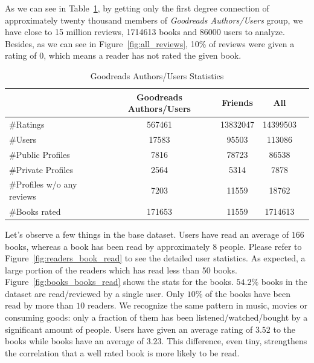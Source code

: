 \documentclass[11pt]{article}
\begin{document}
As we can see in Table~\ref{table:crawl_stat}, by getting only the first degree connection of approximately twenty thousand members of {\it Goodreads Authors/Users} group, we have close to 15 million reviews, 1714613 books and 86000 users to analyze. Besides, as we can see in Figure~\ref{fig:all_reviews}, 10\% of reviews were given a rating of 0, which means a reader has not rated the given book.


\begin{table}[ht]
\begin{center}
\begin{tabular}{lcccc}
\hline
                           &  Goodreads Authors/Users    &   Friends                &   All        \\ \hline
\#Ratings                  &  567461                     &   13832047               &   14399503  \\ \hline
\#Users                    &  17583                      &   95503                  &   113086     \\ \hline
\#Public Profiles          &  7816                       &   78723                  &   86538     \\ \hline
\#Private Profiles         &  2564                       &   5314                   &   7878      \\ \hline
\#Profiles w/o any reviews &  7203                       &   11559                  &   18762      \\ \hline
\#Books rated              &  171653                     &   11559                  &   1714613      \\ \hline
\end{tabular}
\end{center}
\caption{Goodreads Authors/Users Statistics} \label{table:crawl_stat}
\end{table}

Let's observe a few things in the base dataset.
Users have read an average of $166$ books, whereas a book has been read by approximately $8$ people.
Please refer to Figure~\ref{fig:readers_book_read} to see the detailed user statistics.
As expected, a large portion of the readers which has read less than 50 books.
Figure~\ref{fig:books_books_read} shows the stats for the books.
$54.2\%$ books in the dataset are read/reviewed by a single user.
Only $10$\% of the books have been read by more than $10$ readers.
We recognize the same pattern in music, movies or consuming goods: only a fraction of them has been listened/watched/bought by a significant amount of people.
Users have given an average rating of $3.52$ to the books while books have an average of $3.23$.
This difference, even tiny, strengthens the correlation that a well rated book is more likely to be read.
\end{document}
